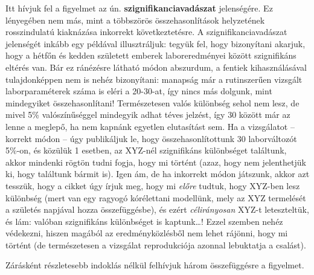 \documentclass[]{book}
\begin{document}
Itt hívjuk fel a figyelmet az ún. \textbf{szignifikanciavadászat}
jelenségére. Ez lényegében nem más, mint a többszörös összehasonlítások
helyzetének rosszindulatú kiaknázása inkorrekt következtetésre. A
szignifikanciavadászat jelenségét inkább egy példával illusztráljuk:
tegyük fel, hogy bizonyítani akarjuk, hogy a hétfőn és kedden született
emberek laboreredményei között szignifikáns eltérés van. Bár ez
ránézésre látható módon abszurdum, a fentiek kihasználásával
tulajdonképpen nem is nehéz bizonyítani: manapság már a rutinszerűen
vizsgált laborparaméterek száma is eléri a 20-30-at, így nincs más
dolgunk, mint mindegyiket összehasonlítani! Természetesen valós
különbség sehol nem lesz, de mivel 5\% valószínűséggel mindegyik adhat
téves jelzést, így 30 között már az lenne a meglepő, ha nem kapnánk
egyetlen elutasítást sem. Ha a vizsgálatot -- korrekt módon -- úgy
publikáljuk le, hogy összehasonlítottunk 30 laborváltozót 5\%-on, és
közülük 1 esetben, az XYZ-nél szignifikáns különbséget találtunk, akkor
mindenki rögtön tudni fogja, hogy mi történt (azaz, hogy nem
jelenthetjük ki, hogy találtunk bármit is). Igen ám, de ha inkorrekt
módon játszunk, akkor azt tesszük, hogy a cikket úgy írjuk meg, hogy mi
\emph{előre} tudtuk, hogy XYZ-ben lesz különbség (mert van egy ragyogó
kórélettani modellünk, mely az XYZ termelését a születés napjával hozza
összefüggésbe), és ezért \emph{célirányosan} XYZ-t leteszteltük, és lám:
valóban szignifikáns különbséget is kaptunk\dots{}! Ezzel szemben nehéz
védekezni, hiszen magából az eredményközlésből nem lehet rájönni, hogy
mi történt (de természetesen a vizsgálat reprodukciója azonnal
lebuktatja a csalást).

Zárásként részletesebb indoklás nélkül felhívjuk három összefüggésre a
figyelmet.
\end{document}
